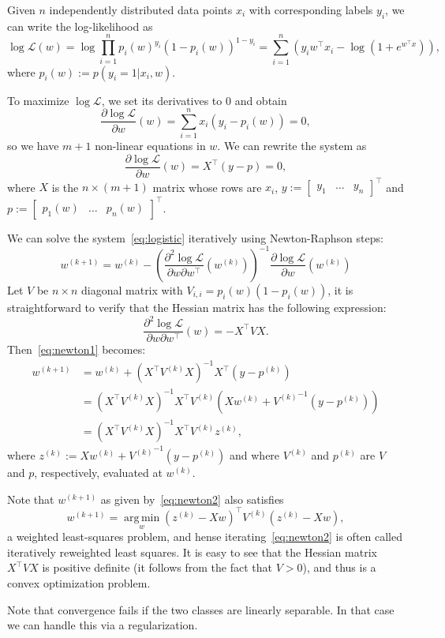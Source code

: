 \documentclass[notitlepage]{report}
\DeclareMathOperator*{\argmin}{arg\,min}
\begin{document}
Given $n$ independently distributed data points $x_i$ with corresponding labels $y_i$, we can write the log-likelihood as
$$
\log \mathcal{L}(w) = \log \prod_{i=1}^n p_i(w)^{y_i}  (1-p_i(w))^{1-y_i} = \sum_{i=1}^n \left(y_i w^\top x_i - \log\left(1+e^{w^\top x}\right)\right),
$$
where $p_i(w):=p(y_i=1|x_i, w)$.

To maximize $\log\mathcal L$, we set its derivatives to 0 and obtain
$$
\frac{\partial\log\mathcal L}{\partial w}(w) = \sum_{i=1}^n x_i(y_i-p_i(w)) = 0,
$$
so we have $m+1$ non-linear equations in $w$. 
We can rewrite the system as
\begin{equation}
\frac{\partial\log\mathcal L}{\partial w}(w) = X^\top (y-p) = 0,
\label{eq:logistic}
\end{equation}
where $X$ is the $n\times (m+1)$ matrix whose rows are $x_i$, $y:=\begin{bmatrix}y_1 & \dots & y_n\end{bmatrix}^\top$ and $p:=\begin{bmatrix}p_1(w) & \dots & p_n(w)\end{bmatrix}^\top$.

We can solve the system~\eqref{eq:logistic} iteratively using Newton-Raphson steps:
\begin{equation}
w^{(k+1)} = w^{(k)} - \left(\frac{\partial^2 \log \mathcal L}{\partial w \partial w^\top}\left(w^{(k)}\right)\right)^{-1}\frac{\partial \log \mathcal L}{\partial w}\left(w^{(k)}\right)
\label{eq:newton1}
\end{equation}
Let $V$ be $n\times n$ diagonal matrix with $V_{i,i} = p_i(w)(1-p_i(w))$, it is straightforward to verify that the Hessian matrix has the following expression:
$$
\frac{\partial^2 \log \mathcal L}{\partial w \partial w^\top}\left(w\right) = -X^\top V X.
$$
Then~\eqref{eq:newton1} becomes:
\begin{equation}
\label{eq:newton2}
\begin{split}
w^{(k+1)} &= w^{(k)} + \left(X^\top V^{(k)} X\right)^{-1} X^\top (y - p^{(k)}) \\
          &= \left(X^\top V^{(k)} X\right)^{-1} X^\top V^{(k)} \left(X w^{(k)} + {V^{(k)}}^{-1} (y - p^{(k)})\right) \\
          &= \left(X^\top V^{(k)} X\right)^{-1} X^\top V^{(k)} z^{(k)},
\end{split}
\end{equation}
where $z^{(k)}:=Xw^{(k)} + {V^{(k)}}^{-1} (y - p^{(k)})$ and where $V^{(k)}$ and $p^{(k)}$ are $V$ and $p$, respectively, evaluated at $w^{(k)}$.

Note that $w^{(k+1)}$ as given by~\eqref{eq:newton2} also satisfies
$$
w^{(k+1)} = \argmin\limits_w \left(z^{(k)}-Xw\right)^\top V^{(k)} \left(z^{(k)}-Xw\right),
$$
a weighted least-squares problem, and hense iterating~\eqref{eq:newton2} is often called iteratively reweighted least squares.
It is easy to see that the Hessian matrix $X^\top V X$ is positive definite (it follows from the fact that $V>0$), and thus is a convex optimization problem.

Note that convergence fails if the two classes are linearly separable. In that case we can handle this via a regularization.
\end{document}
